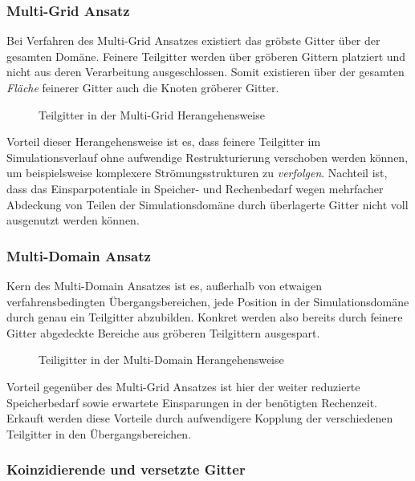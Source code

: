 \subsubsection{Multi-Grid Ansatz}

Bei Verfahren des Multi-Grid Ansatzes existiert das gröbste Gitter über der gesamten Domäne. Feinere Teilgitter werden über gröberen Gittern platziert und nicht aus deren Verarbeitung ausgeschlossen. Somit existieren über der gesamten \emph{Fläche} feinerer Gitter auch die Knoten gröberer Gitter.

\begin{figure}[h]
\centering

\caption{Teilgitter in der Multi-Grid Herangehensweise}
\end{figure}

Vorteil dieser Herangehensweise ist es, dass feinere Teilgitter im Simulationsverlauf ohne aufwendige Restrukturierung verschoben werden können, um beispielsweise komplexere Strömungsstrukturen zu \emph{verfolgen}. Nachteil ist, dass das Einsparpotentiale in Speicher- und Rechenbedarf wegen mehrfacher Abdeckung von Teilen der Simulationsdomäne durch überlagerte Gitter nicht voll ausgenutzt werden können.

\subsubsection{Multi-Domain Ansatz}

Kern des Multi-Domain Ansatzes ist es, außerhalb von etwaigen verfahrensbedingten Übergangsbereichen, jede Position in der Simulationsdomäne durch genau ein Teilgitter abzubilden. Konkret werden also bereits durch feinere Gitter abgedeckte Bereiche aus gröberen Teilgittern ausgespart.

\begin{figure}[h]
\centering

\caption{Teiligitter in der Multi-Domain Herangehensweise}
\end{figure}

\noindent
Vorteil gegenüber des Multi-Grid Ansatzes ist hier der weiter reduzierte Speicherbedarf sowie erwartete Einsparungen in der benötigten Rechenzeit. Erkauft werden diese Vorteile durch aufwendigere Kopplung \cite[Kap.~3.1]{Lagrava12} der verschiedenen Teilgitter in den Übergangsbereichen.

\subsubsection{Koinzidierende und versetzte Gitter}

